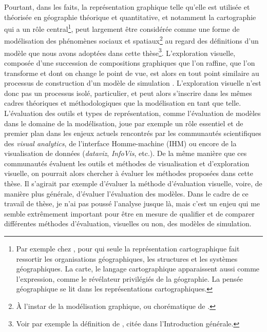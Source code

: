 Pourtant, dans les faits, la représentation graphique telle qu'elle est utilisée et théorisée en géographie théorique et quantitative, et notamment la cartographie qui a un rôle central\footnote{
	Par exemple chez \textcite[246--247]{pinchemel_geographie_1979}, pour qui \og seule la représentation cartographique fait ressortir les organisations géographiques, les structures et les systèmes géographiques.
	La carte, le langage cartographique apparaissent aussi comme l'expression, comme le révélateur privilégiés de la géographie.
	La pensée géographique se lit dans les représentations cartographiques\fg{}.
}, peut largement être considérée comme une forme de modélisation des phénomènes sociaux et spatiaux\footnote{
	À l'instar de la \og modélisation graphique\fg{}, ou chorématique de \textcite{brunet1980composition}.
} au regard des définitions d'un modèle que nous avons adoptées dans cette thèse\footnote{
	Voir par exemple la définition de \textcite{minsky_matter_1965}, citée dans l'Introduction générale.	
}.
L'exploration visuelle, composée d'une succession de compositions graphiques que l'on raffine, que l'on transforme et dont on change le point de vue, est alors en tout point similaire au processus de construction d'un modèle de simulation \autocite{andrienko2018viewing}.
L'exploration visuelle n'est donc pas un processus isolé, particulier, et peut alors s'inscrire dans les mêmes cadres théoriques et méthodologiques que la modélisation en tant que telle.
L'évaluation des outils et types de représentation, comme l'évaluation de modèles dans le domaine de la modélisation, joue par exemple un rôle essentiel et de premier plan dans les enjeux actuels rencontrés par les communautés scientifiques des \textit{visual analytics}, de l'interface Homme-machine (IHM) ou encore de la visualisation de données (\textit{dataviz}, \textit{InfoVis}, etc.).
De la même manière que ces communautés évaluent les outils et méthodes de visualisation et d'exploration visuelle, on pourrait alors chercher à évaluer les méthodes proposées dans cette thèse.
Il s'agirait par exemple d'évaluer la méthode d'évaluation visuelle, voire, de manière plus générale, d'évaluer l'évaluation des modèles.
Dans le cadre de ce travail de thèse, je n'ai pas poussé l'analyse jusque là, mais c'est un enjeu qui me semble extrêmement important pour être en mesure de qualifier et de comparer différentes méthodes d'évaluation, visuelles ou non, des modèles de simulation.

